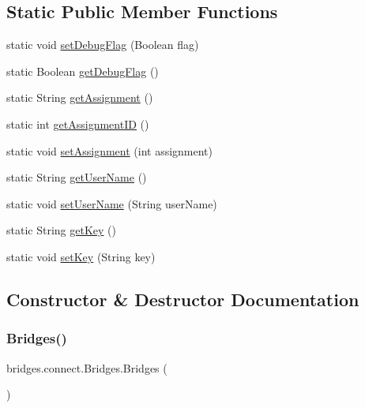 \subsection*{Static Public Member Functions}
\begin{DoxyCompactItemize}
\item 
static void \hyperlink{classbridges_1_1connect_1_1_bridges_a9295b15aa880aa976706ed4f3337fb3b}{set\+Debug\+Flag} (Boolean flag)
\item 
static Boolean \hyperlink{classbridges_1_1connect_1_1_bridges_a5c9fa0dd62084bfd916c8bdecee3f517}{get\+Debug\+Flag} ()
\item 
static String \hyperlink{classbridges_1_1connect_1_1_bridges_af049c06c532987eb616156fb16ea2f43}{get\+Assignment} ()
\item 
static int \hyperlink{classbridges_1_1connect_1_1_bridges_ac13ed456687540b57c138adb11735d95}{get\+Assignment\+ID} ()
\item 
static void \hyperlink{classbridges_1_1connect_1_1_bridges_ad56c9d138965c41947bb51fe056c1cc9}{set\+Assignment} (int assignment)
\item 
static String \hyperlink{classbridges_1_1connect_1_1_bridges_a75f047cda3100e0cfa88378293c12961}{get\+User\+Name} ()
\item 
static void \hyperlink{classbridges_1_1connect_1_1_bridges_af9b9a2ca03ba02c0c2be4716594678a6}{set\+User\+Name} (String user\+Name)
\item 
static String \hyperlink{classbridges_1_1connect_1_1_bridges_a426897d6e5449601bb4e20c32b8346f5}{get\+Key} ()
\item 
static void \hyperlink{classbridges_1_1connect_1_1_bridges_ab69e89ec7d2e674a8b8c4b0be0c63397}{set\+Key} (String key)
\end{DoxyCompactItemize}


\subsection{Constructor \& Destructor Documentation}
\mbox{\label{classbridges_1_1connect_1_1_bridges_a42f0592841a829f93453506c78951b1f}} 
\subsubsection{\texorpdfstring{Bridges()}{Bridges()}\hspace{0.1cm}{\footnotesize\ttfamily [1/2]}}
{\footnotesize\ttfamily bridges.\+connect.\+Bridges.\+Bridges (\begin{DoxyParamCaption}{ }\end{DoxyParamCaption})}

